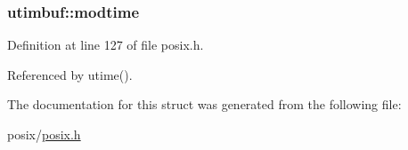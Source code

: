\subsubsection[{\texorpdfstring{modtime}{modtime}}]{ utimbuf\+::modtime}\hypertarget{structutimbuf_a7588ffe699a9eda52e94aa593bf7d6d8}{}\label{structutimbuf_a7588ffe699a9eda52e94aa593bf7d6d8}


Definition at line 127 of file posix.\+h.



Referenced by utime().



The documentation for this struct was generated from the following file\+:\begin{DoxyCompactItemize}
\item 
posix/\hyperlink{posix_8h}{posix.\+h}\end{DoxyCompactItemize}
